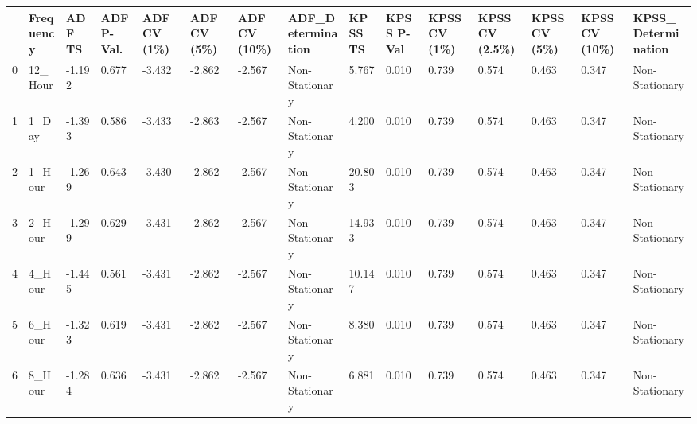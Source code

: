 \begin{tabular}{lllllllllllllll}
\toprule
 & Frequency & ADF TS & ADF P-Val. & ADF CV (1\%) & ADF CV (5\%) & ADF CV (10\%) & ADF_Determination & KPSS TS & KPSS P-Val & KPSS CV (1\%) & KPSS CV (2.5\%) & KPSS CV (5\%) & KPSS CV (10\%) & KPSS_Determination \\
\midrule
0 & 12_Hour & -1.192 & 0.677 & -3.432 & -2.862 & -2.567 & Non-Stationary & 5.767 & 0.010 & 0.739 & 0.574 & 0.463 & 0.347 & Non-Stationary \\
1 & 1_Day & -1.393 & 0.586 & -3.433 & -2.863 & -2.567 & Non-Stationary & 4.200 & 0.010 & 0.739 & 0.574 & 0.463 & 0.347 & Non-Stationary \\
2 & 1_Hour & -1.269 & 0.643 & -3.430 & -2.862 & -2.567 & Non-Stationary & 20.803 & 0.010 & 0.739 & 0.574 & 0.463 & 0.347 & Non-Stationary \\
3 & 2_Hour & -1.299 & 0.629 & -3.431 & -2.862 & -2.567 & Non-Stationary & 14.933 & 0.010 & 0.739 & 0.574 & 0.463 & 0.347 & Non-Stationary \\
4 & 4_Hour & -1.445 & 0.561 & -3.431 & -2.862 & -2.567 & Non-Stationary & 10.147 & 0.010 & 0.739 & 0.574 & 0.463 & 0.347 & Non-Stationary \\
5 & 6_Hour & -1.323 & 0.619 & -3.431 & -2.862 & -2.567 & Non-Stationary & 8.380 & 0.010 & 0.739 & 0.574 & 0.463 & 0.347 & Non-Stationary \\
6 & 8_Hour & -1.284 & 0.636 & -3.431 & -2.862 & -2.567 & Non-Stationary & 6.881 & 0.010 & 0.739 & 0.574 & 0.463 & 0.347 & Non-Stationary \\
\bottomrule
\end{tabular}
